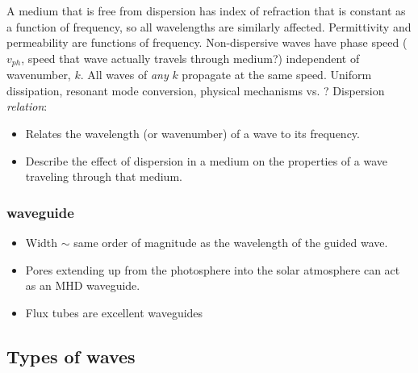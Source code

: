 \documentclass{article}
\begin{document}
A medium that is free from dispersion has index of refraction that is constant
as a function of frequency, so all wavelengths are similarly affected.
Permittivity and permeability are functions of frequency.
Non-dispersive waves have phase speed (${v_{ph}}$, speed that wave actually travels
through medium?) independent of wavenumber, ${k}$.
All waves of \emph{any} ${k}$ propagate at the same speed.
Uniform dissipation, resonant mode conversion, physical mechanisms vs. ?
Dispersion \emph{relation}:
\begin{itemize}
    \item Relates the wavelength (or wavenumber) of a wave to its
        frequency.
    \item Describe the effect of dispersion in a medium on the properties
        of a wave traveling through that medium.
\end{itemize}


\subsubsection{waveguide}
\begin{itemize}
    \item Width $\sim$ same order of magnitude as the wavelength of
        the guided wave.
    \item Pores extending up from the photosphere
        into the solar atmosphere can act as an
        MHD waveguide.
    \item Flux tubes are excellent waveguides
\end{itemize}


\subsection{Types of waves}
\end{document}
